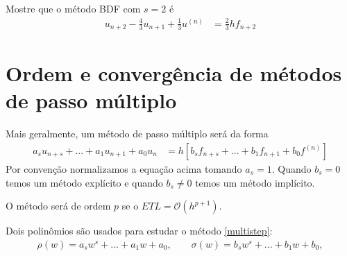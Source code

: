 \begin{exer}
Mostre que o método BDF com $s=2$ é
\begin{eqnarray}
  u_{n+2} -\frac{4}{3} u_{n+1} + \frac{1}{3}u^{(n)} &= \frac{2}{3}h f_{n+2}
\end{eqnarray}
\end{exer}


\section{Ordem e convergência de métodos de passo múltiplo}
Mais geralmente, um método de passo múltiplo será da forma
\begin{eqnarray}\label{multistep}
  a_s u_{n+s}+ ...+ a_1 u_{n+1} + a_0u_{n} &=  h [b_sf_{n+s} +... +b_1f_{n+1} +b_0f^{(n)}]
\end{eqnarray}
Por convenção normalizamos a equação acima tomando $a_s=1$. Quando $b_s=0$ temos um método explícito e quando $b_s \neq 0$ temos um método implícito.

O método será de ordem $p$ se o $ETL=\mathcal O(h^{p+1})$.


Dois polinômios são usados para estudar o método \eqref{multistep}:
\begin{eqnarray}
\rho (w)= a_s w^s + ...+a_1w+a_0, \quad \quad \sigma (w)=b_s w^s + ...+b_1w+b_0,
\end{eqnarray}



